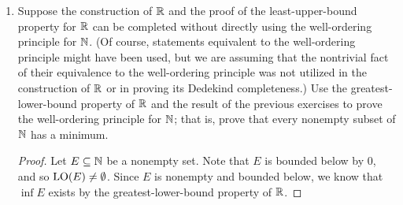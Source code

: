 \documentclass[11pt,a4paper]{article}
\begin{document}
\begin{enumerate}
\begin{enumerate}
\begin{proof}
    Now, we will show that \( (\inf B, \inf B + \epsilon) \cap B \) contains infinitely many points. Thus, suppose for sake of contradiction that the nonempty set \( (\inf B, \inf B + \epsilon) \cap B \) contains FINITELY many points. Denote these points by \( {b}_{i}  \) for \( 1 \leq i \leq n  \); that is
    \[  (\inf B, \inf B + \epsilon) \cap B = \{ {b}_{i} : 1 \leq i \leq n   \}  \]
    For all \( 1 \leq k \leq n  \), let the distance between each \( {b}_{k } \) and \( \inf B  \) be defined by \[ {d}_{k } = | \inf B - {b}_{k } |.  \] Since \( {b}_{k } \in B  \) and \( \inf B \notin  B  \), we must have \( | \inf B - {b}_{k } | > 0  \). Let 
    \[  d = \frac{ \min \{ {d}_{1}, {d}_{2}, \dots, {d}_{n} \}  }{ 2 }. \]
    Note that observe that none of the \( {b}_{i} \) for \( 1 \leq i \leq n   \) lies within the open interval \( (\inf B , \inf B + d) \). That is, the set 
    \[  (\inf B , \inf B + d) \cap B = \emptyset \]
    implies that \( \inf B + d \in \LO(B)  \) which is a contradiction because \( \inf B + d  \) is not a lower bound of \( B \). Thus, the open interval \( (\inf B, \inf B + \epsilon) \) must have infinitely many points.
    \end{proof}
\end{enumerate}

\item Suppose the construction of \( \mathbb{R}  \) and the proof of the least-upper-bound property for \( \mathbb{R}  \) can be completed without directly using the well-ordering principle for \( \mathbb{N}  \). (Of course, statements equivalent to the well-ordering principle might have been used, but we are assuming that the nontrivial fact of their equivalence to the well-ordering principle was not utilized in the construction of \( \mathbb{R}  \) or in proving its Dedekind completeness.) Use the greatest-lower-bound property of \( \mathbb{R}  \) and the result of the previous exercises to prove the well-ordering principle for \( \mathbb{N}  \); that is, prove that every nonempty subset of \( \mathbb{N}  \) has a minimum.
    \begin{proof}
        Let \( E \subseteq \mathbb{N}  \) be a nonempty set. Note that \( E  \) is bounded below by \( 0  \), and so \( \operatorname{LO}(E) \neq \emptyset \). Since \( E  \) is nonempty and bounded below, we know that \( \inf E  \) exists by the greatest-lower-bound property of \( \mathbb{R}  \).



\end{proof}
\end{enumerate}
\end{document}
